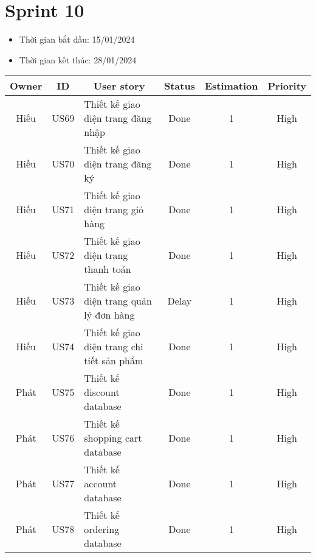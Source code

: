\section{Sprint 10}
\begin{itemize}
    \item Thời gian bắt đầu: 15/01/2024
    \item Thời gian kết thúc: 28/01/2024
\end{itemize}
\begin{table}[H]
    \begin{tabular}{|c|c|m{6cm}|c|c|c|}
    \hline
    \textbf{Owner} & \textbf{ID} & \multicolumn{1}{c|}{\textbf{User story}}                                & \textbf{Status} & \textbf{Estimation} & \textbf{Priority} \\ \hline
    Hiếu         & US69        & Thiết kế giao diện trang đăng nhập                    & Done            & 1                   & High         \\ \hline
    Hiếu        & US70        & Thiết kế giao diện trang đăng ký                     & Done            & 1                   & High         \\ \hline
    Hiếu          & US71        & Thiết kế giao diện trang giỏ hàng                    & Done            & 1                   & High         \\ \hline
    Hiếu         & US72        & Thiết kế giao diện trang thanh toán                   & Done            & 1                   & High         \\ \hline
    Hiếu         & US73        & Thiết kế giao diện trang quản lý đơn hàng                    & Delay            & 1                   & High         \\ \hline
    Hiếu         & US74        & Thiết kế giao diện trang chi tiết sản phẩm                    & Done            & 1                   & High         \\ \hline
    Phát        & US75        & Thiết kế discount database                   & Done            & 1                   & High         \\ \hline
    Phát        & US76        & Thiết kế shopping cart database                    & Done            & 1                   & High         \\ \hline
    Phát        & US77        & Thiết kế account database                   & Done            & 1                   & High         \\ \hline
    Phát        & US78        & Thiết kế ordering database                    & Done            & 1                   & High         \\ \hline

\end{tabular}
\end{table}
